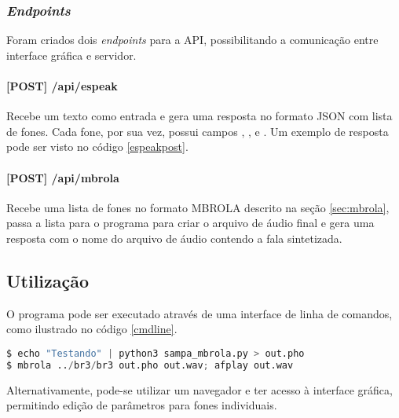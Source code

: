 \subsubsection{\emph{Endpoints}}
Foram criados dois \emph{endpoints} para a API, possibilitando a comunicação entre
interface gráfica e servidor.

\paragraph{[POST] /api/espeak} Recebe um texto como entrada e gera uma resposta
no formato JSON com lista de fones. Cada fone, por sua vez, possui campos ,
,  e . Um exemplo de resposta pode ser visto no código \ref{espeakpost}.
\paragraph{[POST] /api/mbrola} Recebe uma lista de fones no formato MBROLA
descrito na seção \ref{sec:mbrola}, passa a lista para o programa para criar o
arquivo de áudio final e gera uma resposta com o nome do arquivo de áudio
contendo a fala sintetizada.
\subsection{Utilização}
O programa pode ser executado através de uma interface de linha de comandos,
como ilustrado no código \ref{cmdline}.

\begin{lstlisting}[caption=Utilização por linha de comandos, label=cmdline, language=Python]
$ echo "Testando" | python3 sampa_mbrola.py > out.pho
$ mbrola ../br3/br3 out.pho out.wav; afplay out.wav
\end{lstlisting}

Alternativamente, pode-se utilizar um navegador e ter acesso à interface
gráfica, permitindo edição de parâmetros para fones individuais.


